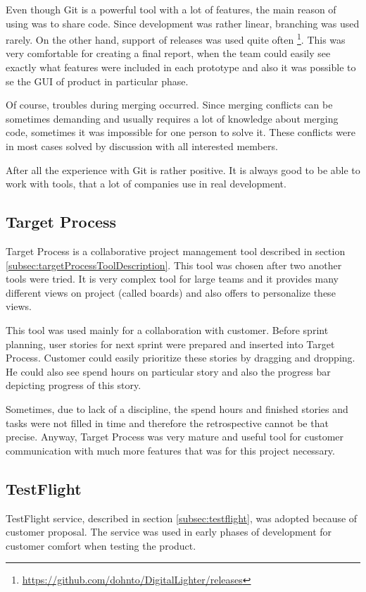 Even though Git is a powerful tool with a lot of features, the main reason of using was to share code.
Since development was rather linear, branching was used rarely.
On the other hand, support of releases was used quite often \footnote{\url{https://github.com/dohnto/DigitalLighter/releases}}.
This was very comfortable for creating a final report, when the team could easily see exactly what features were included in each prototype and also it was possible to se the GUI of product in particular phase.

Of course, troubles during merging occurred.
Since merging conflicts can be sometimes demanding and usually requires a lot of knowledge about merging code, sometimes it was impossible for one person to solve it.
These conflicts were in most cases solved by discussion with all interested members.

After all the experience with Git is rather positive. 
It is always good to be able to work with tools, that a lot of companies use in real development.


\subsection{Target Process}
Target Process is a collaborative project management tool described in section \ref{subsec:targetProcessToolDescription}.
This tool was chosen after two another tools were tried.
It is very complex tool for large teams and it provides many different views on project (called boards) and also offers to personalize these views.

This tool was used mainly for a collaboration with customer. 
Before sprint planning, user stories for next sprint were prepared and inserted into Target Process.
Customer could easily prioritize these stories by dragging and dropping.
He could also see spend hours on particular story and also the progress bar depicting progress of this story.

Sometimes, due to lack of a discipline, the spend hours and finished stories and tasks were not filled in time and therefore the retrospective cannot be that precise.
Anyway, Target Process was very mature and useful tool for customer communication with much more features that was for this project necessary.


\subsection{TestFlight}
TestFlight service, described in section \ref{subsec:testflight}, was adopted because of customer proposal.
The service was used in early phases of development for customer comfort when testing the product.

